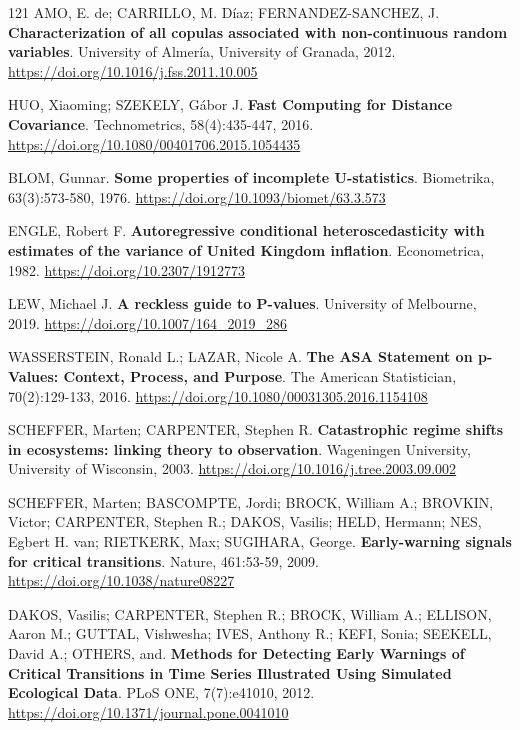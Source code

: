 \begin{thebibliography}{121}
  AMO, E. de; CARRILLO, M. Díaz; FERNANDEZ-SANCHEZ, J.
  \newblock \textbf{Characterization of all copulas associated with non-continuous random variables}.
  \newblock University of Almería, University of Granada, 2012.
  \newblock \url{https://doi.org/10.1016/j.fss.2011.10.005}

  HUO, Xiaoming; SZEKELY, Gábor J.
  \newblock \textbf{Fast Computing for Distance Covariance}.
  \newblock Technometrics, 58(4):435-447, 2016.
  \newblock \url{https://doi.org/10.1080/00401706.2015.1054435}

  BLOM, Gunnar.
  \newblock \textbf{Some properties of incomplete U-statistics}.
  \newblock Biometrika, 63(3):573-580, 1976.
  \newblock \url{https://doi.org/10.1093/biomet/63.3.573}

  ENGLE, Robert F.
  \newblock \textbf{Autoregressive conditional heteroscedasticity with estimates of the variance of United Kingdom inflation}.
  \newblock Econometrica, 1982.
  \newblock \url{https://doi.org/10.2307/1912773}

  LEW, Michael J.
  \newblock \textbf{A reckless guide to P-values}.
  \newblock University of Melbourne, 2019.
  \newblock \url{https://doi.org/10.1007/164_2019_286}

  WASSERSTEIN, Ronald L.; LAZAR, Nicole A.
  \newblock \textbf{The ASA Statement on p-Values: Context, Process, and Purpose}.
  \newblock The American Statistician, 70(2):129-133, 2016.
  \newblock \url{https://doi.org/10.1080/00031305.2016.1154108}

  SCHEFFER, Marten; CARPENTER, Stephen R.
  \newblock \textbf{Catastrophic regime shifts in ecosystems: linking theory to observation}.
  \newblock Wageningen University, University of Wisconsin, 2003.
  \newblock \url{https://doi.org/10.1016/j.tree.2003.09.002}

  SCHEFFER, Marten; BASCOMPTE, Jordi; BROCK, William A.; BROVKIN, Victor; CARPENTER, Stephen R.; DAKOS, Vasilis; HELD, Hermann; NES, Egbert H. van; RIETKERK, Max; SUGIHARA, George.
  \newblock \textbf{Early-warning signals for critical transitions}.
  \newblock Nature, 461:53-59, 2009.
  \newblock \url{https://doi.org/10.1038/nature08227}

  DAKOS, Vasilis; CARPENTER, Stephen R.; BROCK, William A.; ELLISON, Aaron M.; GUTTAL, Vishwesha; IVES, Anthony R.; KEFI, Sonia; SEEKELL, David A.; OTHERS, and.
  \newblock \textbf{Methods for Detecting Early Warnings of Critical Transitions in Time Series Illustrated Using Simulated Ecological Data}.
  \newblock PLoS ONE, 7(7):e41010, 2012.
  \newblock \url{https://doi.org/10.1371/journal.pone.0041010}


\end{thebibliography}
